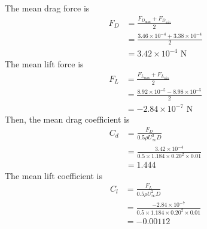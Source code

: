 The mean drag force is
\begin{align*}
    F_D &= \frac{F_{D_{\text{max}}} + F_{D_{\text{min}}}}{2} \\
    &= \frac{3.46 \times 10^{-4} + 3.38 \times 10^{-4}}{2} \\
    &= \boxed{3.42 \times 10^{-4} \text{ N}}
\end{align*}
The mean lift force is
\begin{align*}
    F_L &= \frac{F_{L_{\text{max}}} + F_{L_{\text{min}}}}{2} \\
    &= \frac{8.92 \times 10^{-5} - 8.98 \times 10^{-5}}{2} \\
    &= \boxed{-2.84 \times 10^{-7} \text{ N}}
\end{align*}
Then, the mean drag coefficient is
\begin{align*}
    C_d &= \frac{F_D}{0.5\rho U_\infty^2 D} \\
    &= \frac{3.42 \times 10^{-4}}{0.5 \times 1.184 \times 0.20^2 \times 0.01} \\
    &= \boxed{1.444}
\end{align*}
The mean lift coefficient is
\begin{align*}
    C_l &= \frac{F_L}{0.5\rho U_\infty^2 D} \\
    &= \frac{-2.84 \times 10^{-7}}{0.5 \times 1.184 \times 0.20^2 \times 0.01} \\
    &= \boxed{-0.00112}
\end{align*}

